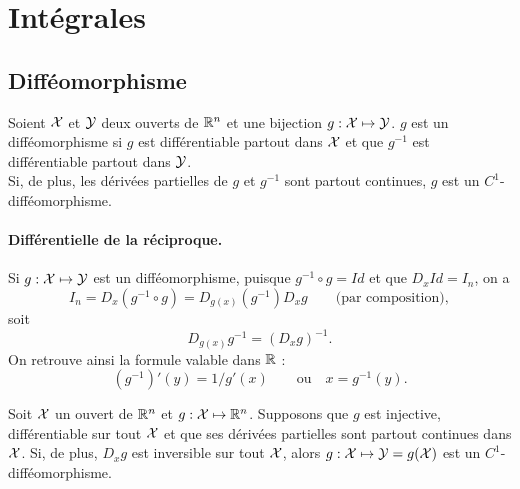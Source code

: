 \section{Intégrales}


% 

\subsection{Difféomorphisme}

\begin{definition}[Difféomorphisme]
  Soient $\mathcal{X}$ et $\mathcal{Y}$ deux ouverts de $\mathbb{R}^n$ et une bijection $g : \mathcal{X} \mapsto \mathcal{Y}$. $g$ est un difféomorphisme si $g$ est différentiable partout dans $\mathcal{X}$ et que $g^{-1}$ est différentiable partout dans $\mathcal{Y}$. \\
  Si, de plus, les dérivées partielles de $g$ et $g^{-1}$ sont partout continues, $g$ est un $C^1$-difféomorphisme.
\end{definition}

\paragraph*{Différentielle de la réciproque.}
Si $g : \mathcal{X} \mapsto \mathcal{Y}$ est un difféomorphisme, puisque $g^{-1} \circ g = Id$ et que $D_x Id = I_n$, on a
$$
I_n = D_x(g^{-1} \circ g) = D_{g(x)}(g^{-1}) D_x g 
\qquad \text{(par composition)},
$$
soit
$$
D_{g(x)}g^{-1} = (D_x g)^{-1}.
$$
On retrouve ainsi la formule valable dans $\mathbb{R}$ :
$$
(g^{-1})'(y) = 1 /g'(x)
\qquad \text{ou} \quad x = g^{-1}(y).
$$

\begin{theorem}
  Soit $\mathcal{X}$ un ouvert de $\mathbb{R}^n$ et $g : \mathcal{X} \mapsto \mathbb{R}^n$. Supposons que $g$ est injective, différentiable sur tout $\mathcal{X}$ et que ses dérivées partielles sont partout continues dans $\mathcal{X}$. Si, de plus, $D_x g$ est inversible sur tout $\mathcal{X}$, alors $g : \mathcal{X} \mapsto \mathcal{Y} = g(\mathcal{X})$ est un $C^1$-difféomorphisme.
\end{theorem}

